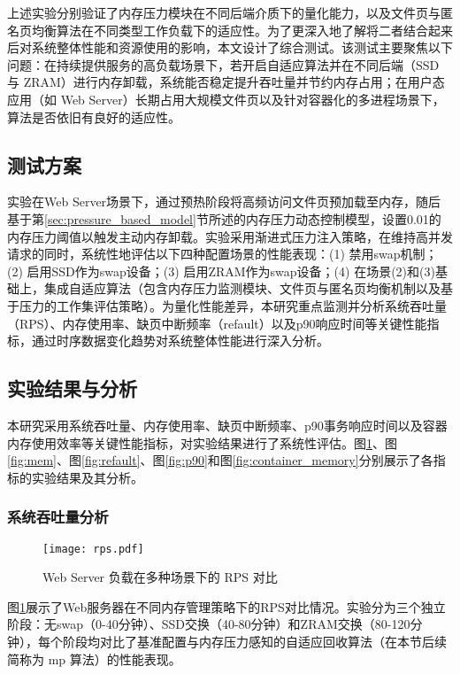 上述实验分别验证了内存压力模块在不同后端介质下的量化能力，以及文件页与匿名页均衡算法在不同类型工作负载下的适应性。为了更深入地了解将二者结合起来后对系统整体性能和资源使用的影响，本文设计了综合测试。该测试主要聚焦以下问题：在持续提供服务的高负载场景下，若开启自适应算法并在不同后端（SSD 与 ZRAM）进行内存卸载，系统能否稳定提升吞吐量并节约内存占用；在用户态应用（如 Web Server）长期占用大规模文件页以及针对容器化的多进程场景下，算法是否依旧有良好的适应性。

\subsection{测试方案}

实验在Web Server场景下，通过预热阶段将高频访问文件页预加载至内存，随后基于第\ref{sec:pressure_based_model}节所述的内存压力动态控制模型，设置0.01的内存压力阈值以触发主动内存卸载。实验采用渐进式压力注入策略，在维持高并发请求的同时，系统性地评估以下四种配置场景的性能表现：(1) 禁用swap机制；(2) 启用SSD作为swap设备；(3) 启用ZRAM作为swap设备；(4) 在场景(2)和(3)基础上，集成自适应算法（包含内存压力监测模块、文件页与匿名页均衡机制以及基于压力的工作集评估策略）。为量化性能差异，本研究重点监测并分析系统吞吐量（RPS）、内存使用率、缺页中断频率（refault）以及p90响应时间等关键性能指标，通过时序数据变化趋势对系统整体性能进行深入分析。

\subsection{实验结果与分析}
\label{sec:test_result}
本研究采用系统吞吐量、内存使用率、缺页中断频率、p90事务响应时间以及容器内存使用效率等关键性能指标，对实验结果进行了系统性评估。图\ref{fig:rps}、图\ref{fig:mem}、图\ref{fig:refault}、图\ref{fig:p90}和图\ref{fig:container_memory}分别展示了各指标的实验结果及其分析。

\subsubsection{系统吞吐量分析}
\begin{figure}[htbp]
    \centering
    \texttt{[image: rps.pdf]}
    \caption{Web Server 负载在多种场景下的 RPS 对比}
    \label{fig:rps}
\end{figure}
图\ref{fig:rps}展示了Web服务器在不同内存管理策略下的RPS对比情况。实验分为三个独立阶段：无swap（0-40分钟）、SSD交换（40-80分钟）和ZRAM交换（80-120分钟），每个阶段均对比了基准配置与内存压力感知的自适应回收算法（在本节后续简称为 mp 算法）的性能表现。

